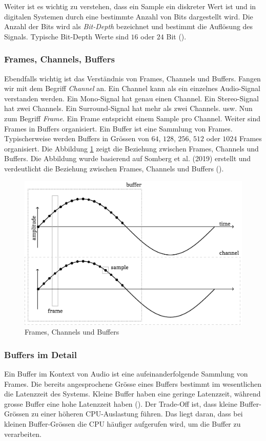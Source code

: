\documentclass[11pt,a4paper]{article}
\begin{document}
\noindent \newline
Weiter ist es wichtig zu verstehen, dass ein Sample ein diskreter Wert ist und in digitalen 
Systemen durch eine bestimmte Anzahl von Bits dargestellt wird. Die Anzahl der Bits wird
als \textit{Bit-Depth} bezeichnet und bestimmt die Auflösung des Signals. Typische
Bit-Depth Werte sind \(16\) oder \(24\) Bit (\cite[p.10]{somberg2019audioapi}).

\subsubsection{Frames, Channels, Buffers}
Ebendfalls wichtig ist das Verständnis von Frames, Channels und Buffers. Fangen wir mit dem Begriff \textit{Channel} an. Ein Channel kann als
ein einzelnes Audio-Signal verstanden werden. Ein Mono-Signal hat genau einen Channel. Ein
Stereo-Signal hat zwei Channels. Ein Surround-Signal hat mehr als zwei Channels. usw.
Nun zum Begriff \textit{Frame}. Ein Frame entspricht einem Sample pro Channel. Weiter sind Frames
in Buffers organisiert. Ein Buffer ist eine Sammlung von Frames. Typischerweise werden Buffers in
Grössen von \(64\), \(128\), \(256\), \(512\) oder \(1024\) Frames organisiert. Die Abbildung
\ref{fig:frames_channels_buffers} zeigt die Beziehung zwischen Frames, Channels und Buffers.
Die Abbildung wurde basierend auf Somberg et al. (2019) erstellt und verdeutlicht die
Beziehung zwischen Frames, Channels und Buffers (\cite[p.10]{somberg2019audioapi}).

\begin{figure}[h]
	\centering
	\includegraphics[width=0.7\linewidth]{img/audio-nutshell.pdf}
	\caption{Frames, Channels und Buffers}
	\label{fig:frames_channels_buffers}
\end{figure}

\subsubsection{Buffers im Detail}
Ein Buffer im Kontext von Audio ist eine aufeinanderfolgende Sammlung von Frames. Die bereits
angesprochene Grösse eines Buffers bestimmt im wesentlichen die Latenzzeit des Systems. Kleine
Buffer haben eine geringe Latenzzeit, während grosse Buffer eine hohe Latenzzeit
haben (\cite[p.10]{somberg2019audioapi}). Der Trade-Off ist, dass kleine Buffer-Grössen
zu einer höheren CPU-Auslastung führen.
Das liegt daran, dass bei kleinen Buffer-Grössen die CPU häufiger aufgerufen wird, um die Buffer
zu verarbeiten.
\end{document}
